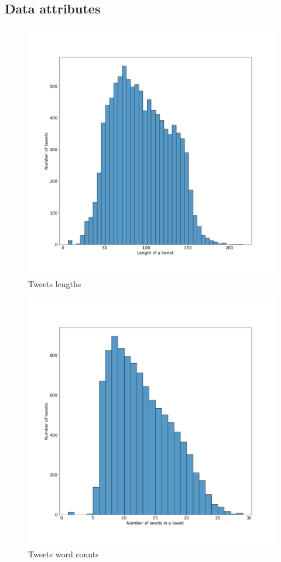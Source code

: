 \documentclass[a4paper]{article}
\begin{document}
\subsection{Data attributes}
\begin{figure}[H]
\centering
\includegraphics[width=\textwidth]{plots/tweet_lengths_plot.png}
\caption{Tweets lengths}
\end{figure}

\begin{figure}[H]
\centering
\includegraphics[width=\textwidth]{plots/tweet_word_counts_plot.png}
\caption{Tweets word counts}
\end{figure}
\end{document}
